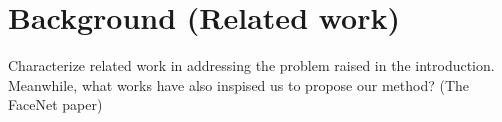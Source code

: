 \section{Background (Related work)}


{
\setlength{\parindent}{4em}
\color{gray} 

\indent Characterize related work in addressing the problem raised in the
introduction.  Meanwhile, what works have also inspised us to propose our method?  (The
FaceNet paper)

}
